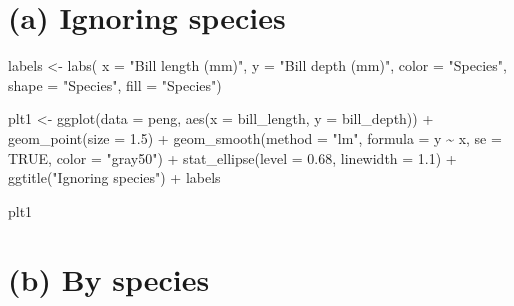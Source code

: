 \documentclass[
  letterpaper,
  10pt,
  krantz2]{krantz}
\makeatletter
\newenvironment{Shaded}{\begin{snugshade}}{\end{snugshade}}
\newcommand{\AttributeTok}[1]{\textcolor[rgb]{0.40,0.45,0.13}{#1}}
\newcommand{\ConstantTok}[1]{\textcolor[rgb]{0.56,0.35,0.01}{#1}}
\newcommand{\FloatTok}[1]{\textcolor[rgb]{0.68,0.00,0.00}{#1}}
\newcommand{\FunctionTok}[1]{\textcolor[rgb]{0.28,0.35,0.67}{#1}}
\newcommand{\NormalTok}[1]{\textcolor[rgb]{0.00,0.23,0.31}{#1}}
\newcommand{\OtherTok}[1]{\textcolor[rgb]{0.00,0.23,0.31}{#1}}
\newcommand{\SpecialCharTok}[1]{\textcolor[rgb]{0.37,0.37,0.37}{#1}}
\newcommand{\StringTok}[1]{\textcolor[rgb]{0.13,0.47,0.30}{#1}}
\newenvironment{kframe}{%
  \medskip{}
  \setlength{\fboxsep}{.8em}
  \def\at@end@of@kframe{}%
  \ifinner\ifhmode%
  \def\at@end@of@kframe{\end{minipage}}%
  \begin{minipage}{\columnwidth}%
  \fi\fi%
  \def\FrameCommand##1{\hskip\@totalleftmargin \hskip-\fboxsep
  \colorbox{shadecolor}{##1}\hskip-\fboxsep
      \hskip-\linewidth \hskip-\@totalleftmargin \hskip\columnwidth}%
  \MakeFramed {\advance\hsize-\width
    \@totalleftmargin\z@ \linewidth\hsize
    \@setminipage}}%
{\par\unskip\endMakeFramed%
  \at@end@of@kframe}
\renewenvironment{Shaded}{\begin{kframe}}{\end{kframe}}
\makeatother
\begin{document}
\section{(a) Ignoring species}

\begin{Shaded}
\begin{Highlighting}[]
\NormalTok{labels }\OtherTok{\textless{}{-}} \FunctionTok{labs}\NormalTok{(}
  \AttributeTok{x =} \StringTok{"Bill length (mm)"}\NormalTok{,}
  \AttributeTok{y =} \StringTok{"Bill depth (mm)"}\NormalTok{,}
  \AttributeTok{color =} \StringTok{"Species"}\NormalTok{,}
  \AttributeTok{shape =} \StringTok{"Species"}\NormalTok{,}
  \AttributeTok{fill =} \StringTok{"Species"}\NormalTok{) }

\NormalTok{plt1 }\OtherTok{\textless{}{-}} \FunctionTok{ggplot}\NormalTok{(}\AttributeTok{data =}\NormalTok{ peng,}
               \FunctionTok{aes}\NormalTok{(}\AttributeTok{x =}\NormalTok{ bill\_length,}
                   \AttributeTok{y =}\NormalTok{ bill\_depth)) }\SpecialCharTok{+}
  \FunctionTok{geom\_point}\NormalTok{(}\AttributeTok{size =} \FloatTok{1.5}\NormalTok{) }\SpecialCharTok{+}
  \FunctionTok{geom\_smooth}\NormalTok{(}\AttributeTok{method =} \StringTok{"lm"}\NormalTok{, }\AttributeTok{formula =}\NormalTok{ y }\SpecialCharTok{\textasciitilde{}}\NormalTok{ x, }
              \AttributeTok{se =} \ConstantTok{TRUE}\NormalTok{, }\AttributeTok{color =} \StringTok{"gray50"}\NormalTok{) }\SpecialCharTok{+}
  \FunctionTok{stat\_ellipse}\NormalTok{(}\AttributeTok{level =} \FloatTok{0.68}\NormalTok{, }\AttributeTok{linewidth =} \FloatTok{1.1}\NormalTok{) }\SpecialCharTok{+}
  \FunctionTok{ggtitle}\NormalTok{(}\StringTok{"Ignoring species"}\NormalTok{) }\SpecialCharTok{+}
\NormalTok{  labels}

\NormalTok{plt1}
\end{Highlighting}
\end{Shaded}

\section{(b) By species}
\end{document}
